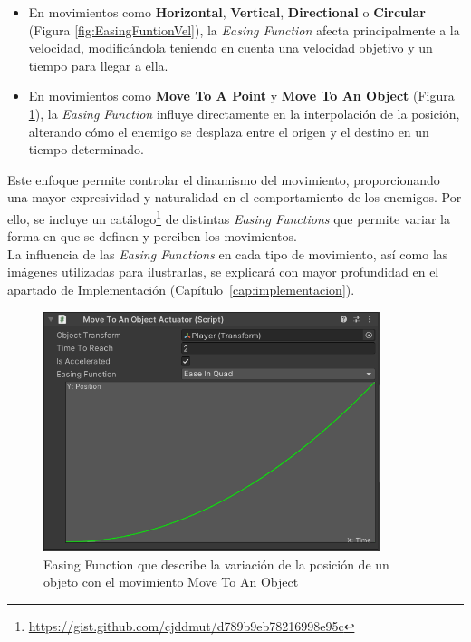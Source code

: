 \begin{itemize}
\item En movimientos como \textbf{Horizontal}, \textbf{Vertical}, \textbf{Directional} o \textbf{Circular} (Figura \ref{fig:EasingFuntionVel}), la \textit{Easing Function} afecta principalmente a la velocidad, modificándola teniendo en cuenta una velocidad objetivo y un tiempo para llegar a ella.
\item En movimientos como \textbf{Move To A Point} y \textbf{Move To An Object} (Figura \ref{fig:EasingFunction}), la \textit{Easing Function} influye directamente en la interpolación de la posición, alterando cómo el enemigo se desplaza entre el origen y el destino en un tiempo determinado.
\end{itemize}

Este enfoque permite controlar el dinamismo del movimiento, proporcionando una mayor expresividad y naturalidad en el comportamiento de los enemigos. Por ello, se incluye un catálogo\footnote{\url{https://gist.github.com/cjddmut/d789b9eb78216998e95c}} de distintas \textit{Easing Functions} que permite variar la forma en que se definen y perciben los movimientos.\\

La influencia de las \textit{Easing Functions} en cada tipo de movimiento, así como las imágenes utilizadas para ilustrarlas, se explicará con mayor profundidad en el apartado de Implementación (Capítulo~\ref{cap:implementacion}).

\begin{figure}[t]
	\centering
	\includegraphics[height=7cm]{Imagenes/EasingFunction.png}
	\caption{Easing Function que describe la variación de la posición de un objeto con el movimiento Move To An Object}
	\label{fig:EasingFunction}
\end{figure}

